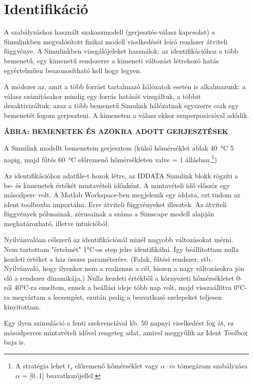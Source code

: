 \chapter{Identifikáció}


A szabályzáshoz használt szakaszmodell (gerjesztés-válasz kapcsolat) a Simulinkben megvalósított fizikai modell viselkedését leíró rendszer átviteli függvénye. A Simulinkben vizsgálójeleket használok: az identifikációhoz a több bemenetű, egy kimenetű rendszerre a kimeneti változást létrehozó hatás egyértelműen beazonosítható kell hogy legyen.

A módszer az, amit a több forrást tartalmazó hálózatok esetén is alkalmazunk: a válasz számításakor mindig egy forrás hatását vizsgáltuk, a többit dezaktivizáltuk: azaz a több bemenetű Simulink hálózatnak egyszerre csak egy bemenetét fogom gerjeszteni. A kimeneten a válasz ekkor szuperpozícióval adódik. 

\textbf{ÁBRA: BEMENETEK ÉS AZOKRA ADOTT GERJESZTÉSEK}

A Simulink modellt bemenetein gerjesztem (külső hőmérséklet ablak \SI{40}{\celsius} 5 napig, majd fűtés \SI{60}{\celsius} előremenő hőmérsékleten valve = 1 állásban.\footnote{A stratégia lehet $t_s$ előremenő hőmérséklet vagy $\alpha \cdot \dot m$ tömegáram szabályzása $\alpha$ = [0..1] beavatkozójellel. })


Az identifikációhoz adatfile-t hozok létre, az IDDATA Simulink blokk rögzíti a be- és kimenetek értékét mintavételi időnként. A mintavételi idő először egy másodperc volt. A Matlab Workspace-ben megjelenik egy iddata, ezt tudom az ident toolboxba importálni. Erre átviteli függvényeket illesztek. Az átviteli függvények pólusainak, zérusainak a száma a Simscape modell alapján meghatározható, illetve intuícióból.

Nyilvánvalóan célszerű az identifikációnál minél nagyobb változásokat mérni. Nem tartottam "értelmét" 1\si{\celsius}-os step jelre identifikálni. Így beállítottam nulla kezdeti értéket a ház összes paraméterére. (Falak, fűtési rendszer, stb. Nyilvánvaló, hogy ilyenkor nem a realizmus a cél, hiszen a nagy változásokra jön elő a rendszer dinamikája.) Nulla kezdeti értékből a környezeti hőmérsékletet 0-ról 40\si{\celsius}-ra emeltem, ennek a beállási ideje több nap volt, majd visszaállítva 0\si{\celsius}-ra megvártam a lecsengést, ezután pedig a beavatkozó szelepeket teljesen kinyitottam. 

Egy ilyen szimuláció a fenti szekvenciával kb. 50 napnyi viselkedést fog át, ez másodperces mintavételi idővel rengeteg adat, amivel meggyűlik az Ident Toolbox baja is.

